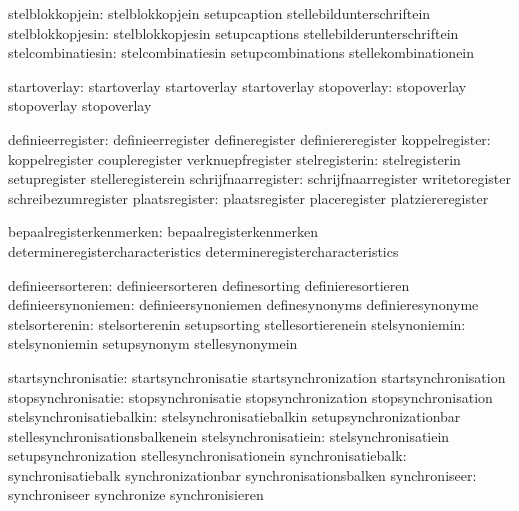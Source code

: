               stelblokkopjein:  stelblokkopjein              setupcaption
                                stellebildunterschriftein
             stelblokkopjesin:  stelblokkopjesin             setupcaptions
                                stellebilderunterschriftein
            stelcombinatiesin:  stelcombinatiesin            setupcombinations
                                stellekombinationein

                 startoverlay:  startoverlay                 startoverlay
                                startoverlay
                  stopoverlay:  stopoverlay                  stopoverlay
                                stopoverlay

            definieerregister:  definieerregister            defineregister
                                definiereregister
               koppelregister:  koppelregister               coupleregister
                                verknuepfregister
               stelregisterin:  stelregisterin               setupregister
                                stelleregisterein
          schrijfnaarregister:  schrijfnaarregister          writetoregister
                                schreibezumregister
               plaatsregister:  plaatsregister               placeregister
                                platziereregister

      bepaalregisterkenmerken:  bepaalregisterkenmerken      determineregistercharacteristics
                                determineregistercharacteristics %

            definieersorteren:  definieersorteren            definesorting
                                definieresortieren
          definieersynoniemen:  definieersynoniemen          definesynonyms
                                definieresynonyme
               stelsorterenin:  stelsorterenin               setupsorting
                                stellesortierenein
               stelsynoniemin:  stelsynoniemin               setupsynonym
                                stellesynonymein

          startsynchronisatie:  startsynchronisatie          startsynchronization
                                startsynchronisation
           stopsynchronisatie:  stopsynchronisatie           stopsynchronization
                                stopsynchronisation
     stelsynchronisatiebalkin:  stelsynchronisatiebalkin     setupsynchronizationbar
                                stellesynchronisationsbalkenein
         stelsynchronisatiein:  stelsynchronisatiein         setupsynchronization
                                stellesynchronisationein
           synchronisatiebalk:  synchronisatiebalk           synchronizationbar
                                synchronisationsbalken
                synchroniseer:  synchroniseer                synchronize
                                synchronisieren

